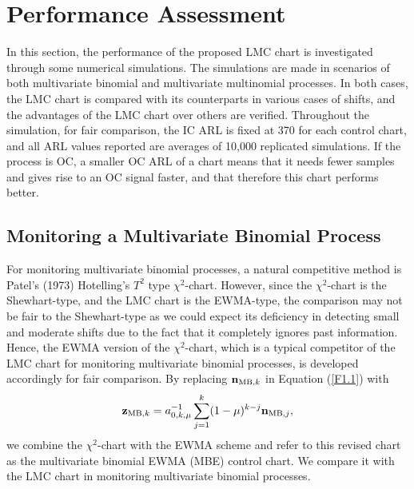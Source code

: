 \section{Performance Assessment}\label{sec2.4}

In this section, the performance of the proposed LMC chart is investigated through
some numerical simulations. The simulations are made in scenarios of both
multivariate binomial and multivariate multinomial processes. In both cases, the LMC
chart is compared with its counterparts in various cases of shifts, and the
advantages of the LMC chart over others are verified. Throughout the simulation, for
fair comparison, the IC ARL is fixed at 370 for each control chart, and all ARL
values reported are averages of 10,000 replicated simulations. If the process is OC,
a smaller OC ARL of a chart means that it needs fewer samples and gives rise to an
OC signal faster, and that therefore this chart performs better.

\subsection{Monitoring a Multivariate Binomial Process}

For monitoring multivariate binomial processes, a natural competitive method is
Patel's (1973) Hotelling's $T^2$ type $\chi^2$-chart. However, since the
$\chi^2$-chart is the Shewhart-type, and the LMC chart is the EWMA-type, the
comparison may not be fair to the Shewhart-type as we could expect its deficiency in
detecting small and moderate shifts due to the fact that it completely ignores past
information. Hence, the EWMA version of the $\chi^2$-chart, which is a typical
competitor of the LMC chart for monitoring multivariate binomial processes, is
developed accordingly for fair comparison. By replacing ${\bf n}_{\mathrm{MB},k}$ in
Equation (\ref{F1.1}) with
\[
{\bf z}_{\mathrm{MB},k}=a_{0,k,\mu}^{-1}\sum_{j=1}^{k}(1-\mu)^{k-j}{\bf
n}_{\mathrm{MB},j},
\]
we combine the $\chi^2$-chart with the EWMA scheme and refer to this revised chart
as the multivariate binomial EWMA (MBE) control chart. We compare it with the LMC
chart in monitoring multivariate binomial processes.

